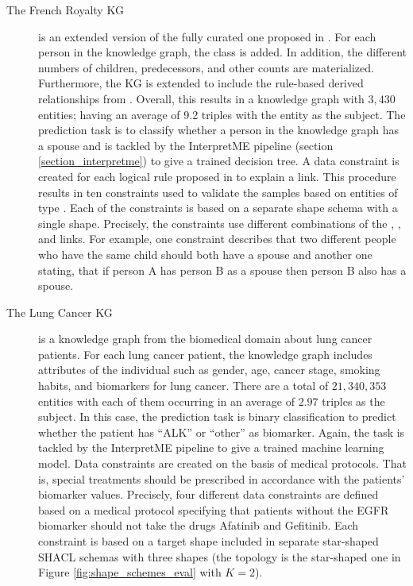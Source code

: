 \begin{description}
    \item[The French Royalty KG] is an extended version of the fully curated one proposed in \cite{Halliwell2021}. For each person in the knowledge graph, the class  is added. In addition, the different numbers of children, predecessors, and other counts are materialized. Furthermore, the KG is extended to include the rule-based derived  relationships from \cite{Halliwell2021}. Overall, this results in a knowledge graph with $3,430$ entities; having an average of 9.2 triples with the entity as the subject. The prediction task is to classify whether a person in the knowledge graph has a spouse and is tackled by the InterpretME pipeline (section \ref{section_interpretme}) to give a trained decision tree. 
    A data constraint is created for each logical rule proposed in \cite{Halliwell2021} to explain a  link. This procedure results in ten constraints used to validate the samples based on entities of type . Each of the constraints is based on a separate shape schema with a single shape. Precisely, the constraints use different combinations of the , , and  links. For example, one constraint describes that two different people who have the same child should both have a spouse and another one stating, that if person A has person B as a spouse then person B also has a spouse.
    
    \item[The Lung Cancer KG] is a knowledge graph from the biomedical domain about lung cancer patients. For each lung cancer patient, the knowledge graph includes attributes of the individual such as gender, age, cancer stage, smoking habits, and biomarkers for lung cancer. There are a total of $21,340,353$ entities with each of them occurring in an average of $2.97$ triples as the subject. In this case, the prediction task is binary classification to predict whether the patient has ``ALK'' or ``other'' as biomarker.  Again, the task is tackled by the InterpretME pipeline to give a trained machine learning model. Data constraints are created on the basis of medical protocols. That is, special treatments should be prescribed in accordance with the patients' biomarker values. Precisely, four different data constraints are defined based on a medical protocol specifying that patients without the EGFR biomarker should not take the drugs Afatinib and Gefitinib. Each constraint is based on a target shape included in separate star-shaped SHACL schemas with three shapes (the topology is the star-shaped one in Figure \ref{fig:shape_schemes_eval} with $K=2$). 
\end{description}

